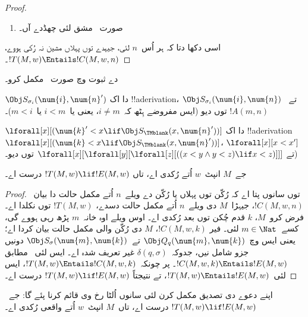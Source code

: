 \documentclass[../../../include/open-logic-section]{subfiles}
\begin{document}
\begin{proof}
\begin{enumerate}
\item صورت~ مشق لئی چھڈدے آں۔
\end{enumerate}
اسی دکھا دتا کہ ہر اُس~$n$ لئی، جیہدے توں پہلاں
مشین نہ رُکی ہووے، $!T(M, w) \Entails !C(M, w, n)$۔
\end{proof}

\begin{prob}
 دے ثبوت وچ
صورت~ مکمل کرو۔
\end{prob}

\begin{prob}
$\Obj S_{\sigma_i}(\num{i}, \num{n}')$ دا اک
!!a{derivation}، $\Obj S_{\sigma_i}(\num{i}, \num{n})$
تے~$!A(m, n)$ توں دیو (ایس مفروضے ہِٹھ کہ~$i \neq
m$، یعنی یا~$i < m$ یا~$m < i$)۔
\end{prob}

\begin{prob}
$\lforall[x][(\num{k}' < x \lif \Obj
  S_\TMblank(x, \num{n}'))]$ دا اک !!a{derivation}
$\lforall[x][(\num{k} < x \lif \Obj
  S_\TMblank(x, \num{n}'))]$، $\lforall[x][x < x']$ تے
$\lforall[x][\lforall[y][\lforall[z][ ((x < y \land y < z) \lif x <
      z)]]]$ توں دیو۔)
\end{prob}


\begin{lem}
جے~$M$ انپٹ~$w$ اُتے رُکدی اے، تاں
$!T(M, w) \lif
!E(M, w)$ درست اے۔
\end{lem}

\begin{proof}
 توں سانوں پتا اے کہ رُکّن توں
پہلاں یا رُکّن دے ویلے~$n$
اُتے مکمل حالت دا بیان~$!C(M, w, n)$، جیہڑا~$M$
دی ویلے~$n$ اُتے مکمل حالت دسدے، $!T(M, w)$
توں نکلدا اے۔ فرض کرو~$M$، $k$ قدم چُکن توں
بعد رُکدی اے۔ اوس ویلے اوہ خانہ~$m$ پڑھ رہی
ہووے گی، کسے~$m \in \Nat$ لئی۔ فیر
$!C(M, w, k)$، $M$ دی رُکّن والی مکمل حالت
بیان کردا اے؛ یعنی ایس وچ~$\Obj Q_q(\num{m}, \num{k})$
تے~$\Obj
S_\sigma(\num{m}, \num{k})$ دونیں جزو شامل نیں،
جدوکہ~$\delta(q,\sigma)$ غیر تعریف شدہ اے۔
ایس لئی~ مطابق
$!C(M, w, k) \Entails !E(M,
w)$۔ پر چونکہ~$!T(M, w) \Entails !C(M, w, k)$،
ایس لئی~$!T(M, w)
\Entails !E(M, w)$، تے نتیجتاً
$!T(M, w) \lif !E(M, w)$ درست اے۔
\end{proof}


\begin{explain} 
اپنے دعوے دی تصدیق مکمل کرن لئی سانوں اُلٹا
رخ وی قائم کرنا پئے گا: جے~$!T(M, w) \lif !E(M, w)$
درست اے، تاں~$M$ انپٹ~$w$ اُتے واقعی
رُکدی اے۔
\end{explain}
\end{document}

